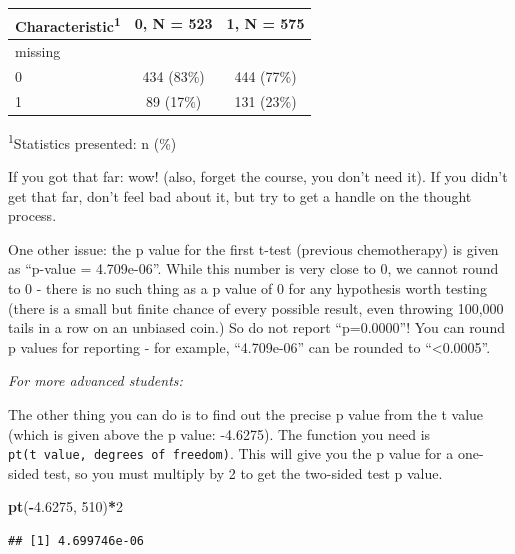 \documentclass[]{book}
\newenvironment{Shaded}{\begin{snugshade}}{\end{snugshade}}
\newcommand{\DecValTok}[1]{\textcolor[rgb]{0.00,0.00,0.81}{#1}}
\newcommand{\FloatTok}[1]{\textcolor[rgb]{0.00,0.00,0.81}{#1}}
\newcommand{\KeywordTok}[1]{\textcolor[rgb]{0.13,0.29,0.53}{\textbf{#1}}}
\newcommand{\NormalTok}[1]{#1}
\newcommand{\OperatorTok}[1]{\textcolor[rgb]{0.81,0.36,0.00}{\textbf{#1}}}
\begin{document}
\captionsetup[table]{labelformat=empty,skip=1pt}
\begin{longtable}{lcc}
\toprule
\textbf{Characteristic}\textsuperscript{1} & \textbf{0}, N = 523 & \textbf{1}, N = 575 \\ 
\midrule
missing &  &  \\ 
0 & 434 (83\%) & 444 (77\%) \\ 
1 & 89 (17\%) & 131 (23\%) \\ 
\bottomrule
\end{longtable}
\vspace{-5mm}
\begin{minipage}{\linewidth}
\textsuperscript{1}Statistics presented: n (\%) \\ 
\end{minipage}

If you got that far: wow! (also, forget the course, you don't need it).
If you didn't get that far, don't feel bad about it, but try to get a
handle on the thought process.

One other issue: the p value for the first t-test (previous
chemotherapy) is given as ``p-value = 4.709e-06''. While this number is
very close to 0, we cannot round to 0 - there is no such thing as a p
value of 0 for any hypothesis worth testing (there is a small but finite
chance of every possible result, even throwing 100,000 tails in a row on
an unbiased coin.) So do not report ``p=0.0000''! You can round p values
for reporting - for example, ``4.709e-06'' can be rounded to
``\textless0.0005''.

\emph{For more advanced students:}

The other thing you can do is to find out the precise p value from the t
value (which is given above the p value: -4.6275). The function you need
is \texttt{pt(t\ value,\ degrees\ of\ freedom)}. This will give you the
p value for a one-sided test, so you must multiply by 2 to get the
two-sided test p value.

\begin{Shaded}
\begin{Highlighting}[]
\KeywordTok{pt}\NormalTok{(}\OperatorTok{-}\FloatTok{4.6275}\NormalTok{, }\DecValTok{510}\NormalTok{)}\OperatorTok{*}\DecValTok{2}
\end{Highlighting}
\end{Shaded}

\begin{verbatim}
## [1] 4.699746e-06
\end{verbatim}
\end{document}
